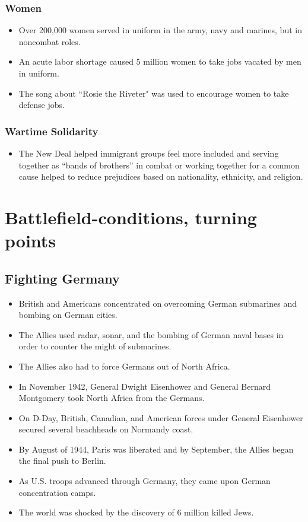 \documentclass[12pt]{article} %
\begin{document}
	\subsubsection{Women}
	\begin{itemize}
		\item Over 200,000 women served in uniform in the army, navy and marines, but in noncombat roles.
		\item An acute labor shortage caused 5 million women to take jobs vacated by men in uniform.
		\item The song about ``Rosie the Riveter" was used to encourage women to take defense jobs.
	\end{itemize}

	\subsubsection{Wartime Solidarity}
	\begin{itemize}
		\item The New Deal helped immigrant groups feel more included and serving together as ``bands of brothers'' in
			combat or working together for a common cause helped to reduce prejudices based on nationality, ethnicity,
			and religion.
	\end{itemize}

	\section{Battlefield-conditions, turning points}

	\subsection{Fighting Germany}
	\begin{itemize}
		\item British and Americans concentrated on overcoming German submarines and bombing on German cities.
		\item The Allies used radar, sonar, and the bombing of German naval bases in order to counter the might of submarines.
		\item The Allies also had to force Germans out of North Africa.
		\item In November 1942, General Dwight Eisenhower and General Bernard Montgomery took North Africa from the Germans.
		\item On D-Day, British, Canadian, and American forces under General Eisenhower secured several beachheads on 
			Normandy coast.
		\item By August of 1944, Paris was liberated and by September, the Allies began the final push to Berlin.
		\item As U.S. troops advanced through Germany, they came upon German concentration camps.
		\item The world was shocked by the discovery of 6 million killed Jews.
	\end{itemize}
\end{document}
